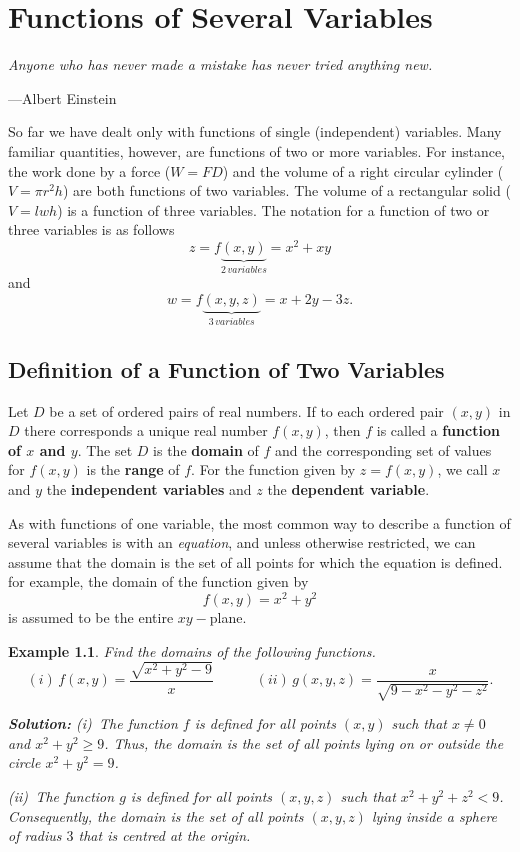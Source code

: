 \documentclass[titlepage,a4paper,12pt]{report}
\newtheorem{example}{Example}[section]
\begin{document}
\chapter{Functions of Several Variables}
\begin{center}
\small{\parbox{18cm}{
		\begin{raggedright}
		{\small
		\textit{Anyone who has never made a mistake has never tried anything new.}
 }
 
				\vspace{.5cm}\hfill{---Albert Einstein}
		\end{raggedright}
	}
} 
\end{center}
So far we have dealt only with functions of single (independent) variables. Many familiar quantities, however, are functions of two or more variables. For instance, the work done by a force ($W=FD$) and the volume of a right circular cylinder ($V=\pi r^2 h$) are both functions of two variables. The volume of a rectangular solid ($V=lwh$) is a function of three variables.  The notation for a function of two or three variables is as follows 
\[z=f\underbrace{(x,y)}_{2\, variables}=x^2+xy\] and \[w=f\underbrace{(x,y,z)}_{3\, variables} =x+2y-3z.\]
\section{Definition of a Function of Two Variables}
Let $D$ be a set of ordered pairs of real numbers. If to each ordered pair $(x,y)$ in $D$ there corresponds a unique real number $f(x,y)$, then $f$ is called a \textbf{function of $x$ and $y$}. The set $D$ is the \textbf{domain} of $f$ and the corresponding set of values for $f(x,y)$ is the \textbf{range} of $f$. For the function given by $z=f(x,y)$, we call $x$ and $y$ the \textbf{independent variables} and $z$ the \textbf{dependent variable}.

\noindent As with functions of one variable, the most common way to describe a function of several variables is with an \textit{equation}, and unless otherwise restricted, we can assume that the domain is the set of all points for which the equation is defined. for example, the domain of the function given by 
\[f(x,y)=x^2+y^2\] is assumed to be the entire $xy-$plane.

\begin{example}
Find the domains of the following functions.
\[(i)\, f(x,y)=\dfrac{\sqrt{x^2+y^2-9}}{x} \quad \quad \quad  (ii)\, g(x,y,z)=\dfrac{x}{\sqrt{9-x^2-y^2-z^2}}.\]

\noindent \textbf{Solution:} (i)\, The function $f$ is defined for all points $(x,y)$ such that $x\neq 0$ and $x^2+y^2\geq 9$. Thus, the domain is the set of all points lying on or outside the circle $x^2+y^2=9$.

\noindent (ii)\, The function $g$ is defined for all points $(x,y,z)$ such that $x^2+y^2+z^2<9$. Consequently, the domain is the set of all points $(x,y,z)$ lying inside a sphere of radius $3$ that is centred at the origin.
\end{example}
\end{document}
